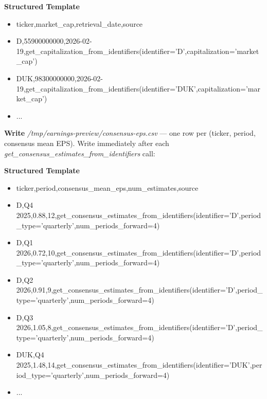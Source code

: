 \documentclass[11pt]{article}
\begin{document}
\textbf{Structured Template}
\begin{itemize}[leftmargin=*,itemsep=2pt,topsep=2pt]
\item {} ticker,market\_\allowbreak{}cap,retrieval\_\allowbreak{}date,source
\item {} D,55900000000,2026-02-19,get\_\allowbreak{}capitalization\_\allowbreak{}from\_\allowbreak{}identifiers(identifier='D',capitalization='market\_\allowbreak{}cap')
\item {} DUK,98300000000,2026-02-19,get\_\allowbreak{}capitalization\_\allowbreak{}from\_\allowbreak{}identifiers(identifier='DUK',capitalization='market\_\allowbreak{}cap')
\item {} ...
\end{itemize}

\textbf{Write} \emph{/tmp/earnings-preview/consensus-eps.csv} — one row per (ticker, period, consensus mean EPS). Write immediately after each \emph{get\_\allowbreak{}consensus\_\allowbreak{}estimates\_\allowbreak{}from\_\allowbreak{}identifiers} call:

\textbf{Structured Template}
\begin{itemize}[leftmargin=*,itemsep=2pt,topsep=2pt]
\item {} ticker,period,consensus\_\allowbreak{}mean\_\allowbreak{}eps,num\_\allowbreak{}estimates,source
\item {} D,Q4 2025,0.88,12,get\_\allowbreak{}consensus\_\allowbreak{}estimates\_\allowbreak{}from\_\allowbreak{}identifiers(identifier='D',period\_\allowbreak{}type='quarterly',num\_\allowbreak{}periods\_\allowbreak{}forward=4)
\item {} D,Q1 2026,0.72,10,get\_\allowbreak{}consensus\_\allowbreak{}estimates\_\allowbreak{}from\_\allowbreak{}identifiers(identifier='D',period\_\allowbreak{}type='quarterly',num\_\allowbreak{}periods\_\allowbreak{}forward=4)
\item {} D,Q2 2026,0.91,9,get\_\allowbreak{}consensus\_\allowbreak{}estimates\_\allowbreak{}from\_\allowbreak{}identifiers(identifier='D',period\_\allowbreak{}type='quarterly',num\_\allowbreak{}periods\_\allowbreak{}forward=4)
\item {} D,Q3 2026,1.05,8,get\_\allowbreak{}consensus\_\allowbreak{}estimates\_\allowbreak{}from\_\allowbreak{}identifiers(identifier='D',period\_\allowbreak{}type='quarterly',num\_\allowbreak{}periods\_\allowbreak{}forward=4)
\item {} DUK,Q4 2025,1.48,14,get\_\allowbreak{}consensus\_\allowbreak{}estimates\_\allowbreak{}from\_\allowbreak{}identifiers(identifier='DUK',period\_\allowbreak{}type='quarterly',num\_\allowbreak{}periods\_\allowbreak{}forward=4)
\item {} ...
\end{itemize}
\end{document}

